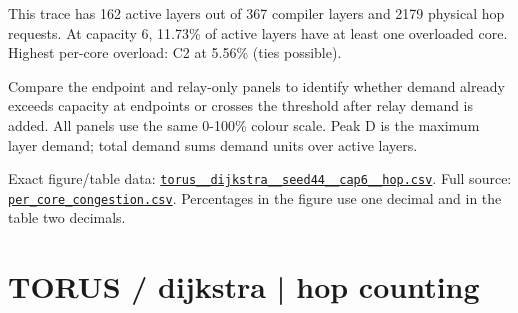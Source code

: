 \documentclass[10pt,a4paper]{article}
\begin{document}
This trace has 162 active layers out of 367 compiler layers and 2179 physical hop requests. At capacity 6, 11.73\% of active layers have at least one overloaded core. Highest per-core overload: C2 at 5.56\% (ties possible).\par
Compare the endpoint and relay-only panels to identify whether demand already exceeds capacity at endpoints or crosses the threshold after relay demand is added. All panels use the same 0-100\% colour scale. Peak D is the maximum layer demand; total demand sums demand units over active layers.\par
Exact figure/table data: \href{\detokenize{file:///home/dhruv-pansuriya/Documents/BTP/Compiler-Driven-ACE/output/pdf/qaoa_methods_congestion/tables/torus__dijkstra__seed44__cap6__hop.csv}}{\nolinkurl{torus__dijkstra__seed44__cap6__hop.csv}}. Full source: \href{\detokenize{file:///home/dhruv-pansuriya/Documents/BTP/Compiler-Driven-ACE/results/qaoa_2seed_2026-10-26/congestion/per_core_congestion.csv}}{\nolinkurl{per_core_congestion.csv}}. Percentages in the figure use one decimal and in the table two decimals.\par
\clearpage
\section*{TORUS / dijkstra | hop counting}
\end{document}
